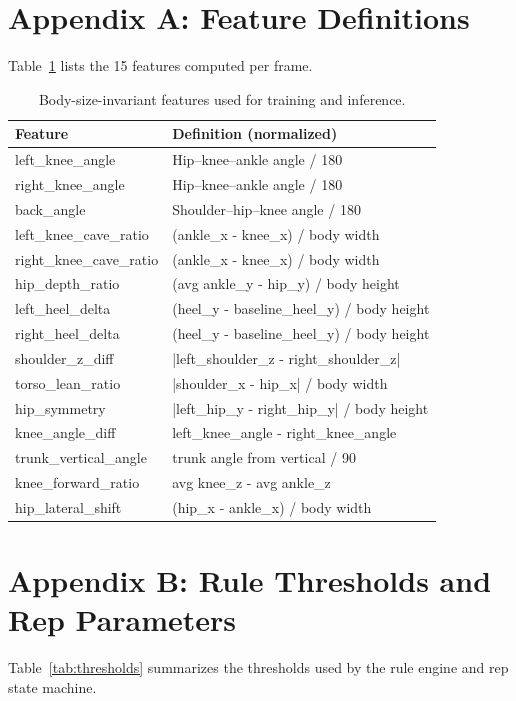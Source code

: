 \documentclass[11pt]{article}
\begin{document}



\appendix
\section{Appendix A: Feature Definitions}
Table~\ref{tab:features} lists the 15 features computed per frame.

\begin{table}[t]
  \centering
  \small
  \begin{tabular}{ll}
    \toprule
    \textbf{Feature} & \textbf{Definition (normalized)} \\
    \midrule
    left\_knee\_angle & Hip--knee--ankle angle / 180 \\
    right\_knee\_angle & Hip--knee--ankle angle / 180 \\
    back\_angle & Shoulder--hip--knee angle / 180 \\
    left\_knee\_cave\_ratio & (ankle\_x - knee\_x) / body width \\
    right\_knee\_cave\_ratio & (ankle\_x - knee\_x) / body width \\
    hip\_depth\_ratio & (avg ankle\_y - hip\_y) / body height \\
    left\_heel\_delta & (heel\_y - baseline\_heel\_y) / body height \\
    right\_heel\_delta & (heel\_y - baseline\_heel\_y) / body height \\
    shoulder\_z\_diff & |left\_shoulder\_z - right\_shoulder\_z| \\
    torso\_lean\_ratio & |shoulder\_x - hip\_x| / body width \\
    hip\_symmetry & |left\_hip\_y - right\_hip\_y| / body height \\
    knee\_angle\_diff & left\_knee\_angle - right\_knee\_angle \\
    trunk\_vertical\_angle & trunk angle from vertical / 90 \\
    knee\_forward\_ratio & avg knee\_z - avg ankle\_z \\
    hip\_lateral\_shift & (hip\_x - ankle\_x) / body width \\
    \bottomrule
  \end{tabular}
  \caption{Body-size-invariant features used for training and inference.}
  \label{tab:features}
\end{table}

\section{Appendix B: Rule Thresholds and Rep Parameters}
Table~\ref{tab:thresholds} summarizes the thresholds used by the rule engine and rep state machine.
\end{document}
